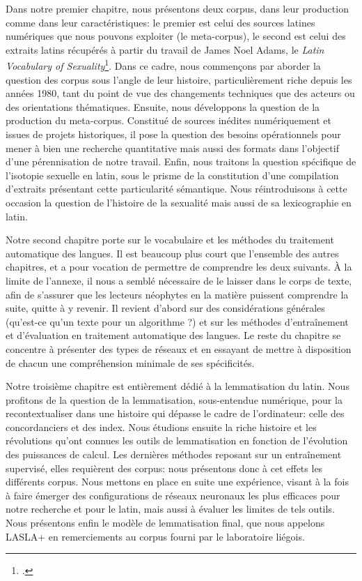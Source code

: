 Dans notre premier chapitre, nous présentons deux corpus, dans leur production comme dans leur caractéristiques: le premier est celui des sources latines numériques que nous pouvons exploiter (le meta-corpus), le second est celui des extraits latins récupérés à partir du travail de James Noel Adams, le \textit{Latin Vocabulary of Sexuality}\footcite{adams}. Dans ce cadre, nous commençons par aborder la question des corpus sous l'angle de leur histoire, particulièrement riche depuis les années 1980, tant du point de vue des changements techniques que des acteurs ou des orientations thématiques. Ensuite, nous développons la question de la production du meta-corpus. Constitué de sources inédites numériquement et issues de projets historiques, il pose la question des besoins opérationnels pour mener à bien une recherche quantitative mais aussi des formats dans l'objectif d'une pérennisation de notre travail. Enfin, nous traitons la question spécifique de l'isotopie sexuelle en latin, sous le prisme de la constitution d'une compilation d'extraits présentant cette particularité sémantique. Nous réintroduisons à cette occasion la question de l'histoire de la sexualité mais aussi de sa lexicographie en latin.

Notre second chapitre porte sur le vocabulaire et les méthodes du traitement automatique des langues. Il est beaucoup plus court que l'ensemble des autres chapitres, et a pour vocation de permettre de comprendre les deux suivants. À la limite de l'annexe, il nous a semblé nécessaire de le laisser dans le corps de texte, afin de s'assurer que les lecteurs néophytes en la matière puissent comprendre la suite, quitte à y revenir. Il revient d'abord sur des considérations générales (qu'est-ce qu'un texte pour un algorithme ?) et sur les méthodes d'entraînement et d'évaluation en traitement automatique des langues. Le reste du chapitre se concentre à présenter des types de réseaux et en essayant de mettre à disposition de chacun une compréhension minimale de ses spécificités.

Notre troisième chapitre est entièrement dédié à la lemmatisation du latin. Nous profitons de la question de la lemmatisation, sous-entendue numérique, pour la recontextualiser dans une histoire qui dépasse le cadre de l'ordinateur: celle des concordanciers et des index. Nous étudions ensuite la riche histoire et les révolutions qu'ont connues les outils de lemmatisation en fonction de l'évolution des puissances de calcul. Les dernières méthodes reposant sur un entraînement supervisé, elles requièrent des corpus: nous présentons donc à cet effets les différents corpus. Nous mettons en place en suite une expérience, visant à la fois à faire émerger des configurations de réseaux neuronaux les plus efficaces pour notre recherche et pour le latin, mais aussi à évaluer les limites de tels outils. Nous présentons enfin le modèle de lemmatisation final, que nous appelons LASLA+ en remerciements au corpus fourni par le laboratoire liégois.

